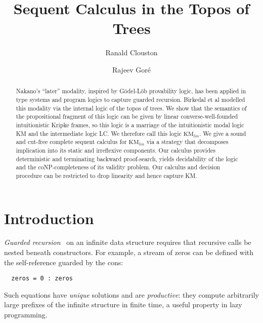 \documentclass[envcountsect,envcountsame]{llncs}
\newcommand{\lcnxt}{\mathrm{KM}_{lin}}
\begin{document}
\frontmatter          \pagestyle{headings}  \mainmatter
\title{Sequent Calculus in the Topos of Trees}

  \author{Ranald Clouston \and Rajeev Gor\'e}
 

\maketitle              
\begin{abstract}
 Nakano's ``later'' modality, inspired by G\"{o}del-L\"{o}b
 provability logic, has been applied in type systems and program logics
 to capture guarded recursion.
 Birkedal et al modelled this modality via the internal logic of the
 topos of trees. We show that the semantics of the propositional
 fragment of this logic
 can be given by linear converse-well-founded
 intuitionistic Kripke frames, so this logic is a marriage of
 the intuitionistic modal logic KM and the intermediate logic LC.
 We therefore call this logic $\lcnxt$.
 We give a sound and cut-free complete sequent calculus for 
 $\lcnxt$ via
 a strategy that decomposes implication into its static and
 irreflexive components. 
 Our calculus provides
 deterministic and terminating backward proof-search, yields 
 decidability of the logic and the coNP-completeness of its validity
 problem.
 Our calculus and decision procedure
 can be restricted to drop linearity and hence capture KM.
\end{abstract}

\section{Introduction}

\emph{Guarded recursion}~\cite{Coquand:Infinite} on an infinite data structure
requires that recursive calls be nested beneath constructors. For
example, a stream of zeros can be defined
with the self-reference guarded by the cons:
\begin{lstlisting}
  zeros = 0 : zeros
\end{lstlisting}
Such equations have \emph{unique} solutions and are \emph{productive}: they
compute arbitrarily large prefixes of the infinite structure in finite time,
a useful property in lazy programming.
\end{document}
